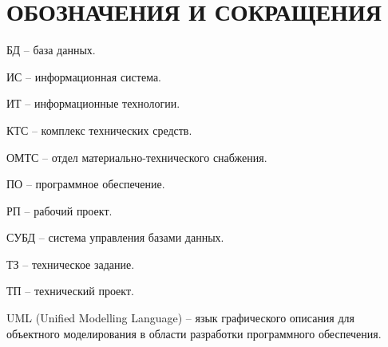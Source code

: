\section*{ОБОЗНАЧЕНИЯ И СОКРАЩЕНИЯ}

БД -- база данных.

ИС -- информационная система.

ИТ -- информационные технологии. 

КТС -- комплекс технических средств.

ОМТС -- отдел материально-технического снабжения. 

ПО -- программное обеспечение.

РП -- рабочий проект.

СУБД -- система управления базами данных.

ТЗ -- техническое задание.

ТП -- технический проект.

UML (Unified Modelling Language) -- язык графического описания для объектного моделирования в области разработки программного обеспечения.
